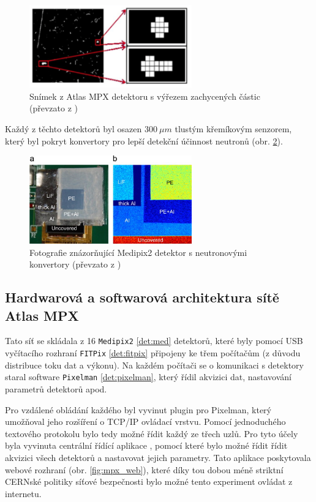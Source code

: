 \begin{figure}[ht]
	\begin{center}
		\includegraphics[width=7cm]{figures/mpx_cluster.png}
		\caption{Snímek z Atlas MPX detektoru s výřezem zachycených částic (převzato z \cite{atlasmpx})}
		\label{fig:mpx_cluster}
	\end{center}
\end{figure}


Každý z těchto detektorů byl osazen $300~\mu m$ tlustým křemíkovým senzorem, který byl pokryt konvertory pro lepší detekční účinnost neutronů (obr. \ref{fig:mpx_lay}).

\begin{figure}[ht]
	\begin{center}
		\includegraphics[width=7cm]{figures/mpx-layers.jpg}
		\caption{Fotografie znázorňující Medipix2 detektor s neutronovými konvertory (převzato z \cite{Vykydal200935})}
		\label{fig:mpx_lay}
	\end{center}
\end{figure}

\subsection{Hardwarová a softwarová architektura sítě Atlas MPX}
Tato síť se skládala z 16 \texttt{Medipix2} \ref{det:med} detektorů, které byly pomocí USB vyčítacího rozhraní \texttt{FITPix} \ref{det:fitpix} připojeny ke třem počítačům (z důvodu distribuce toku dat a výkonu). Na každém počítači se o komunikaci s detektory staral software \texttt{Pixelman} \ref{det:pixelman}, který řídil akvizici dat, nastavování parametrů detektorů apod. 

Pro vzdálené obládání každého byl vyvinut plugin pro Pixelman, který umožňoval jeho rozšíření o TCP/IP ovládací vrstvu. Pomocí jednoduchého textového protokolu bylo tedy možné řídit každý ze třech uzlů. Pro tyto účely byla vyvinuta centrální řídící aplikace \cite{Turecek2011S45}, pomocí které bylo možné řídit řídit akvizici všech detektorů a nastavovat jejich parametry. Tato aplikace poskytovala webové rozhraní (obr. \ref{fig:mpx_web}), které díky tou dobou méně striktní CERNské politiky síťové bezpečnosti bylo možné tento experiment ovládat z internetu.

